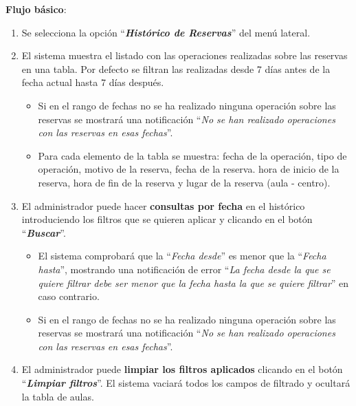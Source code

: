 \textbf{Flujo básico}:
    \begin{enumerate}
        \item Se selecciona la opción ``\textbf{\textit{Histórico de Reservas}}'' del menú lateral.
            
        \item El sistema muestra el listado con las operaciones realizadas sobre las reservas en una tabla. Por defecto se filtran las realizadas desde 7 días antes de la fecha actual hasta 7 días después.
            \begin{itemize}
            \tightlist
                \item Si en el rango de fechas no se ha realizado ninguna operación sobre las reservas se mostrará una notificación  ``\textit{No se han realizado operaciones con las reservas en esas fechas}''.
                
                \item Para cada elemento de la tabla se muestra: fecha de la operación, tipo de operación, motivo de la reserva, fecha de la reserva. hora de inicio de la reserva, hora de fin de la reserva y lugar de la reserva (aula - centro).
            \end{itemize}
            
        \item El administrador puede hacer \textbf{consultas por fecha} en el histórico introduciendo los filtros que se quieren aplicar y clicando en el botón ``\textbf{\textit{Buscar}}''.
            \begin{itemize}
            \tightlist
                \item El sistema comprobará que la ``\textit{Fecha desde}'' es menor que la ``\textit{Fecha hasta}'', mostrando una notificación de error ``\textit{La fecha desde la que se quiere filtrar debe ser menor que la fecha hasta la que se quiere filtrar}'' en caso contrario.
                
                \item Si en el rango de fechas no se ha realizado ninguna operación sobre las reservas se mostrará una notificación  ``\textit{No se han realizado operaciones con las reservas en esas fechas}''.
            \end{itemize}
            
        \item El administrador puede \textbf{limpiar los filtros aplicados} clicando en el botón ``\textbf{\textit{Limpiar filtros}}''. El sistema vaciará todos los campos de filtrado y ocultará la tabla de aulas.
    \end{enumerate}

